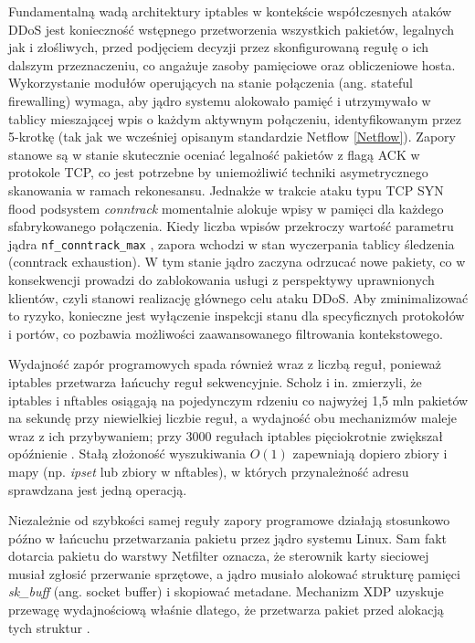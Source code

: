 \documentclass[a4paper,12pt]{article}
\begin{document}
Fundamentalną wadą architektury iptables w kontekście współczesnych ataków DDoS jest konieczność wstępnego przetworzenia wszystkich pakietów, legalnych jak i złośliwych, przed podjęciem decyzji przez skonfigurowaną regułę o ich dalszym przeznaczeniu, co angażuje zasoby pamięciowe oraz obliczeniowe hosta. Wykorzystanie modułów operujących na stanie połączenia (ang. stateful firewalling) wymaga, aby jądro systemu alokowało pamięć i utrzymywało w tablicy mieszającej wpis o każdym aktywnym połączeniu, identyfikowanym przez 5-krotkę (tak jak we wcześniej opisanym standardzie Netflow \ref{Netflow}). Zapory stanowe są w stanie skutecznie oceniać legalność pakietów z flagą ACK w protokole TCP, co jest potrzebne by uniemożliwić techniki asymetrycznego skanowania w ramach rekonesansu. Jednakże w trakcie ataku typu TCP SYN flood podsystem \textit{conntrack} momentalnie alokuje wpisy w pamięci dla każdego sfabrykowanego połączenia. Kiedy liczba wpisów przekroczy wartość parametru jądra \texttt{nf\_conntrack\_max} \cite{kernel_conntrack}, zapora wchodzi w stan wyczerpania tablicy śledzenia (conntrack exhaustion). W tym stanie jądro zaczyna odrzucać nowe pakiety, co w konsekwencji prowadzi do zablokowania usługi z perspektywy uprawnionych klientów, czyli stanowi realizację głównego celu ataku DDoS. Aby zminimalizować to ryzyko, konieczne jest wyłączenie inspekcji stanu dla specyficznych protokołów i portów, co pozbawia możliwości zaawansowanego filtrowania kontekstowego.

Wydajność zapór programowych spada również wraz z liczbą reguł, ponieważ iptables przetwarza łańcuchy reguł sekwencyjnie. Scholz i in. zmierzyli, że iptables i nftables osiągają na pojedynczym rdzeniu co najwyżej 1,5 mln pakietów na sekundę przy niewielkiej liczbie reguł, a wydajność obu mechanizmów maleje wraz z ich przybywaniem; przy 3000 regułach iptables pięciokrotnie zwiększał opóźnienie \cite{scholz2018performance}. Stałą złożoność wyszukiwania $O(1)$ zapewniają dopiero zbiory i mapy (np. \textit{ipset} lub zbiory w nftables), w których przynależność adresu sprawdzana jest jedną operacją.

Niezależnie od szybkości samej reguły zapory programowe działają stosunkowo późno w łańcuchu przetwarzania pakietu przez jądro systemu Linux. Sam fakt dotarcia pakietu do warstwy Netfilter oznacza, że sterownik karty sieciowej musiał zgłosić przerwanie sprzętowe, a jądro musiało alokować strukturę pamięci \textit{sk\_buff} (ang. socket buffer) i skopiować metadane. Mechanizm XDP uzyskuje przewagę wydajnościową właśnie dlatego, że przetwarza pakiet przed alokacją tych struktur \cite{scholz2018performance}.
\end{document}
